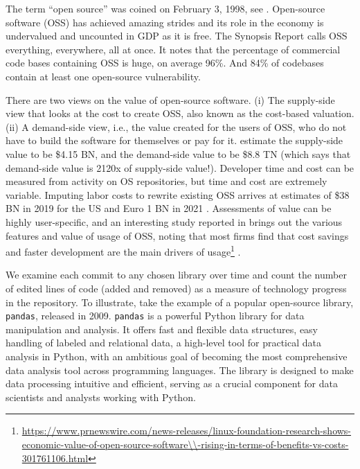 \documentclass[conference]{IEEEtran}
\begin{document}
The term ``open source'' was coined on February 3, 1998, see  \cite{peterson_how_2018}. Open-source software (OSS) has achieved amazing strides and its role in the economy is undervalued and uncounted in GDP as it is free. The Synopsis Report \citep{bals_2024_2024} calls OSS everything, everywhere, all at once. It notes that the percentage of commercial code bases containing OSS is huge, on average 96\%. And 84\% of codebases contain at least one open-source vulnerability. 

There are two views on the value of open-source software. (i) The supply-side view that looks at the cost to create OSS, also known as the cost-based valuation. (ii) A demand-side view, i.e., the value created for the users of OSS, who do not have to build the software for themselves or pay for it. \cite{hoffmann_value_2024} estimate the supply-side value to be \$4.15 BN, and the demand-side value to be \$8.8 TN (which says that demand-side value is 2120x of supply-side value!). Developer time and cost can be measured from activity on OS repositories, but time and cost are extremely variable. Imputing labor costs to rewrite existing OSS arrives at estimates of \$38 BN in 2019 for the US \citep{robbins_first_2021} and Euro 1 BN in 2021 \citep{blind_impact_2021, blind_estimating_2024}. Assessments of value can be highly user-specific, and an interesting study reported in \cite{chesbrough_measuring_2023} brings out the various features and value of usage of OSS, noting that most firms find that cost savings and faster development are the main drivers of usage\footnote{\url{https://www.prnewswire.com/news-releases/linux-foundation-research-shows-economic-value-of-open-source-software\\-rising-in-terms-of-benefits-vs-costs-301761106.html}} \citep{wladawsky-berger_impact_2022, wladawsky-berger_whats_2024}.

We examine each commit to any chosen library over time and count the number of edited lines of code (added and removed) as a measure of technology progress in the repository. To illustrate, take the example of a popular open-source library, {\tt pandas}, released in 2009. {\tt pandas} is a powerful Python library for data manipulation and analysis. It offers fast and flexible data structures, easy handling of labeled and relational data, a high-level tool for practical data analysis in Python, with an ambitious goal of becoming the most comprehensive data analysis tool across programming languages. The library is designed to make data processing intuitive and efficient, serving as a crucial component for data scientists and analysts working with Python. 
\end{document}

